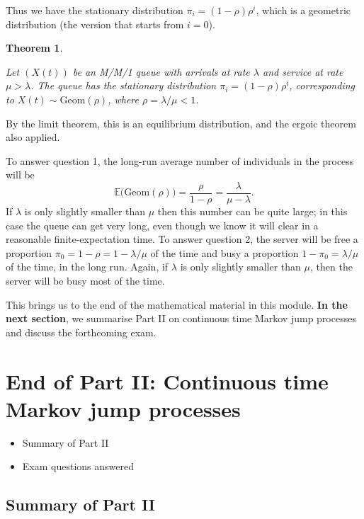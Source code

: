 \documentclass[
  a4paper,
]{article}
\providecommand{\tightlist}{%
  \setlength{\itemsep}{0pt}\setlength{\parskip}{0pt}}
\newtheorem{theorem}{Theorem}[section]
\theoremstyle{definition}
\theoremstyle{definition}
\theoremstyle{definition}
\theoremstyle{remark}
\begin{document}
Thus we have the stationary distribution \(\pi_i = (1 - \rho)\rho^i\),
which is a geometric distribution (the version that starts from \(i = 0\)).

\begin{theorem}
\protect\hypertarget{thm:MMone-thm}{}\label{thm:MMone-thm}

Let \((X(t))\) be an M/M/1 queue with arrivals at rate \(\lambda\) and service at rate \(\mu > \lambda\). The queue has the stationary distribution \(\pi_i = (1 - \rho)\rho^i\), corresponding to \(X(t) \sim \mathrm{Geom}(\rho)\), where \(\rho = \lambda/\mu < 1\).

\end{theorem}

By the limit theorem, this is an equilibrium distribution, and the ergoic theorem also applied.

To answer question 1, the long-run average number of individuals in the process will be
\[ \mathbb E\big(\text{Geom}(\rho)\big) = \frac{\rho}{1-\rho} = \frac{\lambda}{\mu - \lambda} . \]
If \(\lambda\) is only slightly smaller than \(\mu\) then this number can be quite large; in this case the queue can get very long, even though we know it will clear in a reasonable finite-expectation time.
To answer question 2, the server will be free a proportion \(\pi_0 = 1 - \rho = 1 - \lambda/\mu\) of the time and busy a proportion \(1 - \pi_0 = \lambda/\mu\) of the time, in the long run. Again, if \(\lambda\) is only slightly smaller than \(\mu\), then the server will be busy most of the time.

This brings us to the end of the mathematical material in this module. \textbf{In the next section}, we summarise Part II on continuous time Markov jump processes and discuss the forthcoming exam.

\hypertarget{S22-end}{%
\section{End of Part II: Continuous time Markov jump processes}\label{S22-end}}

\begin{itemize}
\tightlist
\item
  Summary of Part II
\item
  Exam questions answered
\end{itemize}

\hypertarget{summary-ii}{%
\subsection{Summary of Part II}\label{summary-ii}}
\end{document}
